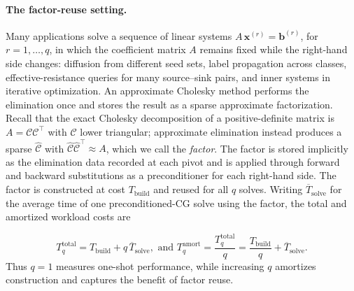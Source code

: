 \documentclass{article}
\newcommand{\1}{\mathbbm{1}}
\theoremstyle{plain}
\begin{document}
\paragraph{\textbf{The factor-reuse setting}.}
Many applications solve a sequence of linear systems $A\,\mathbf{x}^{(r)}=\mathbf{b}^{(r)}$, for $r=1,\ldots,q$, in which the coefficient matrix $A$ remains fixed while the right-hand side changes: diffusion from different seed sets, label propagation across classes, effective-resistance queries for many
source--sink pairs, and inner systems in iterative optimization.
An approximate Cholesky method performs the elimination once and stores the result as a sparse approximate factorization. Recall that the exact Cholesky decomposition of a positive-definite matrix is
$A=\mathcal{C}\mathcal{C}^\top$ with $\mathcal{C}$ lower triangular;
approximate elimination instead produces a sparse
$\widehat{\mathcal{C}}$ with
$\widehat{\mathcal{C}}\widehat{\mathcal{C}}^\top\approx A$, which we call the \emph{factor}. The factor is stored implicitly as the elimination data recorded at each pivot and is applied through forward and backward substitutions as a preconditioner for each right-hand side. The factor is constructed at cost $T_{\mathrm{build}}$ and reused for all
$q$ solves. Writing $\overline{T}_{\mathrm{solve}}$ for the average time of one preconditioned-CG solve using the factor, the total and amortized workload costs are

\begin{equation*}
  T_q^{\mathrm{total}}
  = T_{\mathrm{build}}
    + q\,\overline{T}_{\mathrm{solve}},
  \text{ and }
  T_q^{\mathrm{amort}}
  = \frac{T_q^{\mathrm{total}}}{q}
  = \frac{T_{\mathrm{build}}}{q}
    + \overline{T}_{\mathrm{solve}}.
\end{equation*}
Thus $q=1$ measures one-shot performance, while increasing $q$
amortizes construction and captures the benefit of factor reuse.
\end{document}
